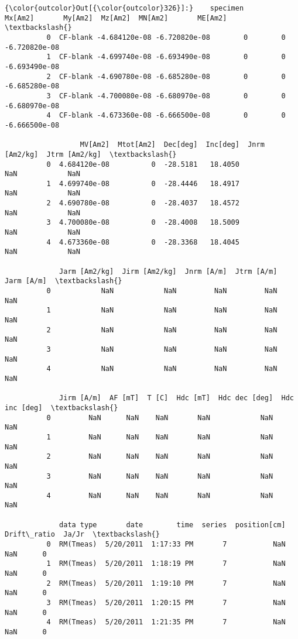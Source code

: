 \documentclass{article}
\begin{document}
            \begin{Verbatim}[commandchars=\\\{\}]
{\color{outcolor}Out[{\color{outcolor}326}]:}    specimen       Mx[Am2]       My[Am2]  Mz[Am2]  MN[Am2]       ME[Am2]  \textbackslash{}
          0  CF-blank -4.684120e-08 -6.720820e-08        0        0 -6.720820e-08   
          1  CF-blank -4.699740e-08 -6.693490e-08        0        0 -6.693490e-08   
          2  CF-blank -4.690780e-08 -6.685280e-08        0        0 -6.685280e-08   
          3  CF-blank -4.700080e-08 -6.680970e-08        0        0 -6.680970e-08   
          4  CF-blank -4.673360e-08 -6.666500e-08        0        0 -6.666500e-08   
          
                  MV[Am2]  Mtot[Am2]  Dec[deg]  Inc[deg]  Jnrm [Am2/kg]  Jtrm [Am2/kg]  \textbackslash{}
          0  4.684120e-08          0  -28.5181   18.4050            NaN            NaN   
          1  4.699740e-08          0  -28.4446   18.4917            NaN            NaN   
          2  4.690780e-08          0  -28.4037   18.4572            NaN            NaN   
          3  4.700080e-08          0  -28.4008   18.5009            NaN            NaN   
          4  4.673360e-08          0  -28.3368   18.4045            NaN            NaN   
          
             Jarm [Am2/kg]  Jirm [Am2/kg]  Jnrm [A/m]  Jtrm [A/m]  Jarm [A/m]  \textbackslash{}
          0            NaN            NaN         NaN         NaN         NaN   
          1            NaN            NaN         NaN         NaN         NaN   
          2            NaN            NaN         NaN         NaN         NaN   
          3            NaN            NaN         NaN         NaN         NaN   
          4            NaN            NaN         NaN         NaN         NaN   
          
             Jirm [A/m]  AF [mT]  T [C]  Hdc [mT]  Hdc dec [deg]  Hdc inc [deg]  \textbackslash{}
          0         NaN      NaN    NaN       NaN            NaN            NaN   
          1         NaN      NaN    NaN       NaN            NaN            NaN   
          2         NaN      NaN    NaN       NaN            NaN            NaN   
          3         NaN      NaN    NaN       NaN            NaN            NaN   
          4         NaN      NaN    NaN       NaN            NaN            NaN   
          
             data type       date        time  series  position[cm]  Drift\_ratio  Ja/Jr  \textbackslash{}
          0  RM(Tmeas)  5/20/2011  1:17:33 PM       7           NaN          NaN      0   
          1  RM(Tmeas)  5/20/2011  1:18:19 PM       7           NaN          NaN      0   
          2  RM(Tmeas)  5/20/2011  1:19:10 PM       7           NaN          NaN      0   
          3  RM(Tmeas)  5/20/2011  1:20:15 PM       7           NaN          NaN      0   
          4  RM(Tmeas)  5/20/2011  1:21:35 PM       7           NaN          NaN      0   
          

\end{Verbatim}
\end{document}
